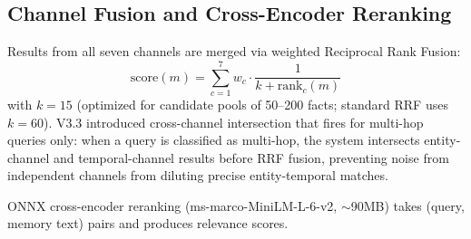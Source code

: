 \subsection{Channel Fusion and Cross-Encoder Reranking}

Results from all seven channels are merged via weighted Reciprocal Rank Fusion:
\begin{equation}
\text{score}(m) = \sum_{c=1}^{7} w_c \cdot \frac{1}{k + \text{rank}_c(m)}
\end{equation}
with $k = 15$ (optimized for candidate pools of 50--200 facts; standard RRF uses $k = 60$). V3.3 introduced cross-channel intersection that fires for multi-hop queries only: when a query is classified as multi-hop, the system intersects entity-channel and temporal-channel results before RRF fusion, preventing noise from independent channels from diluting precise entity-temporal matches.

ONNX cross-encoder reranking (ms-marco-MiniLM-L-6-v2, $\sim$90MB) takes (query, memory text) pairs and produces relevance scores.

